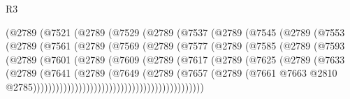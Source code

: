 \begin{lexlean}{R3}
\begin{coremodule}
                  (@2789
                    (@7521
                      (@2789
                        (@7529
                          (@2789
                            (@7537
                              (@2789
                                (@7545
                                  (@2789
                                    (@7553
                                      (@2789
                                        (@7561
                                          (@2789
                                            (@7569
                                              (@2789
                                                (@7577
                                                  (@2789
                                                    (@7585
                                                      (@2789
                                                        (@7593
                                                          (@2789
                                                            (@7601
                                                              (@2789
                                                                (@7609
                                                                  (@2789
                                                                    (@7617
                                                                      (@2789
                                                                        (@7625
                                                                          (@2789
                                                                            (@7633
                                                                              (@2789
                                                                                (@7641
                                                                                  (@2789
                                                                                    (@7649
                                                                                      (@2789
                                                                                        (@7657
                                                                                          (@2789
                                                                                            (@7661
                                                                                              @7663
                                                                                              @2810
                                                                                              @2785)))))))))))))))))))))))))))))))))))))))))))))

\end{coremodule}
\end{lexlean}
